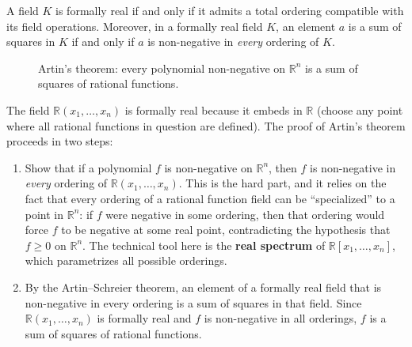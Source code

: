 \begin{theorem}\label{thm:artin-schreier}
A field $K$ is formally real if and only if it admits a total ordering compatible with its field operations. Moreover, in a formally real field $K$, an element $a$ is a sum of squares in $K$ if and only if $a$ is non-negative in \emph{every} ordering of $K$.
\end{theorem}

\begin{figure}[htbp]
\centering
{}
\caption{Artin's theorem: every polynomial non-negative on $\mathbb{R}^n$ is a sum of squares of rational functions.}
\label{fig:sos-decision}
\end{figure}

The field $\mathbb{R}(x_1,\ldots,x_n)$ is formally real because it embeds in $\mathbb{R}$ (choose any point where all rational functions in question are defined). The proof of Artin's theorem proceeds in two steps:

\begin{enumerate}
    \item Show that if a polynomial $f$ is non-negative on $\mathbb{R}^n$, then $f$ is non-negative in \emph{every} ordering of $\mathbb{R}(x_1,\ldots,x_n)$. This is the hard part, and it relies on the fact that every ordering of a rational function field can be ``specialized'' to a point in $\mathbb{R}^n$: if $f$ were negative in some ordering, then that ordering would force $f$ to be negative at some real point, contradicting the hypothesis that $f \geq 0$ on $\mathbb{R}^n$. The technical tool here is the \textbf{real spectrum} of $\mathbb{R}[x_1,\ldots,x_n]$, which parametrizes all possible orderings.
    \item By the Artin--Schreier theorem, an element of a formally real field that is non-negative in every ordering is a sum of squares in that field. Since $\mathbb{R}(x_1,\ldots,x_n)$ is formally real and $f$ is non-negative in all orderings, $f$ is a sum of squares of rational functions.
\end{enumerate}

